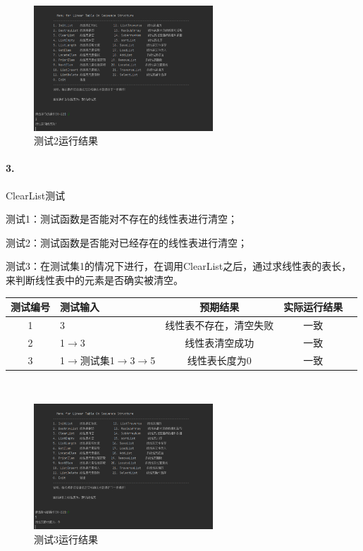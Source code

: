 \documentclass[supercite]{Experimental_Report}
\theoremstyle{definition}
\begin{document}
~\

 \begin{figure}[H]
 	\centering
 	\includegraphics[width=0.6\textwidth]{images/线性表测试2.png}
 	\caption{测试2运行结果}
 	\label{txlab}
 \end{figure}


\paragraph{ 3.}ClearList测试

测试1：测试函数是否能对不存在的线性表进行清空；

测试2：测试函数是否能对已经存在的线性表进行清空；

测试3：在测试集1的情况下进行，在调用ClearList之后，通过求线性表的表长，来判断线性表中的元素是否确实被清空。

\vspace{0.5em}

\begin{tabular}{|c|l|c|c|c|}
	\hline
	测试编号 & 测试输入 & 预期结果 & 实际运行结果 \\
	\hline
	1 & 3 & 线性表不存在，清空失败 & 一致 \\
	\hline
	2 & 1$\rightarrow$3 & 线性表清空成功 & 一致 \\
	\hline
	3 & 1$\rightarrow$测试集1$\rightarrow$3$\rightarrow$5 & 线性表长度为0 & 一致 \\
	\hline
\end{tabular}

~\

 \begin{figure}[H]
 	\centering
 	\includegraphics[width=0.6\textwidth]{images/线性表测试3.png}
 	\caption{测试3运行结果}
 	\label{txlab}
 \end{figure}
\end{document}
